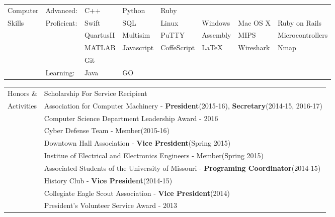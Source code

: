 \documentclass{article}
\begin{document}
\begin{tabular}{p{1.5cm} l l l l l l l}
Computer	& Advanced: 	& C++ 		& Python 	& Ruby		& 			& 			& 					\\
Skills		& Proficient:	& Swift 	& SQL 		& Linux 	& Windows 	& Mac OS X 	& Ruby on Rails  	\\
			&				& QuartusII & Multisim 	& PuTTY 	& Assembly 	& MIPS 		& Microcontrollers  \\
			& 				& MATLAB	& Javascript& CoffeScript& LaTeX	& Wireshark	& Nmap				\\
			& 				& Git		& 			& 			& 			& 			& 					\\

			& Learning:		& Java 		& GO 		& 			 & 			& 			& 					\\
\end{tabular}

\begin{tabular}{p{1.5cm} l}
Honors \&	& Scholarship For Service Recipient 																		\\
Activities	& Association for Computer Machinery - \textbf{President}(2015-16), \textbf{Secretary}(2014-15, 2016-17)	\\
			& Computer Science Department Leadership Award - 2016														\\
			& Cyber Defense Team - Member(2015-16) 																		\\
			& Downtown Hall Association - \textbf{Vice President}(Spring 2015)											\\
			& Institue of Electrical and Electronics Engineers - Member(Spring 2015)									\\
			& Associated Students of the University of Missouri - \textbf{Programing Coordinator}(2014-15)				\\
			& History Club - \textbf{Vice President}(2014-15) 															\\
			& Collegiate Eagle Scout Association - \textbf{Vice President}(2014) 										\\
			& President's Volunteer Service Award - 2013																\\
\end{tabular}
\end{document}
